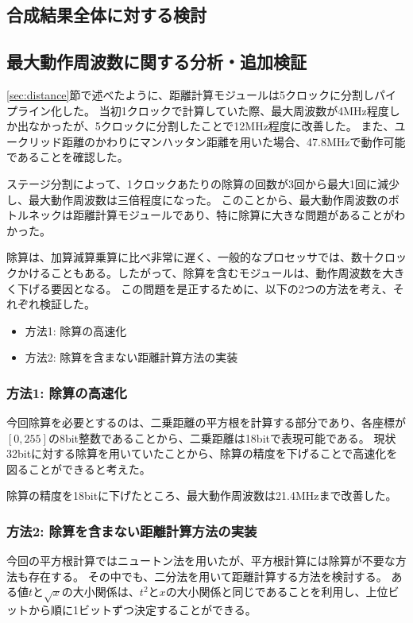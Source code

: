 \subsection{合成結果全体に対する検討}


\subsection{最大動作周波数に関する分析・追加検証}
\ref{sec:distance}節で述べたように、距離計算モジュールは5クロックに分割しパイプライン化した。
当初1クロックで計算していた際、最大周波数が4MHz程度しか出なかったが、5クロックに分割したことで12MHz程度に改善した。
また、ユークリッド距離のかわりにマンハッタン距離を用いた場合、47.8MHzで動作可能であることを確認した。

ステージ分割によって、1クロックあたりの除算の回数が3回から最大1回に減少し、最大動作周波数は三倍程度になった。
このことから、最大動作周波数のボトルネックは距離計算モジュールであり、特に除算に大きな問題があることがわかった。

除算は、加算減算乗算に比べ非常に遅く、一般的なプロセッサでは、数十クロックかけることもある。したがって、除算を含むモジュールは、動作周波数を大きく下げる要因となる。
この問題を是正するために、以下の2つの方法を考え、それぞれ検証した。
\begin{itemize}
    \item 方法1: 除算の高速化
    \item 方法2: 除算を含まない距離計算方法の実装
\end{itemize}
\subsubsection{方法1: 除算の高速化}
今回除算を必要とするのは、二乗距離の平方根を計算する部分であり、各座標が$[0,255]$の8bit整数であることから、二乗距離は18bitで表現可能である。
現状32bitに対する除算を用いていたことから、除算の精度を下げることで高速化を図ることができると考えた。

除算の精度を18bitに下げたところ、最大動作周波数は21.4MHzまで改善した。

\subsubsection{方法2: 除算を含まない距離計算方法の実装}
今回の平方根計算ではニュートン法を用いたが、平方根計算には除算が不要な方法も存在する。
その中でも、二分法を用いて距離計算する方法を検討する。
ある値$t$と$\sqrt{x}$の大小関係は、$t^2$と$x$の大小関係と同じであることを利用し、上位ビットから順に1ビットずつ決定することができる。

